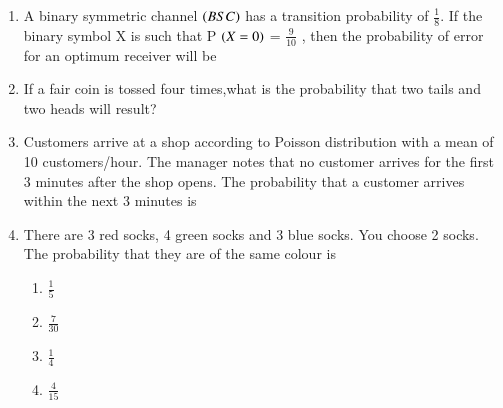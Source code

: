 \documentclass[journal,12pt,twocolumn]{IEEEtran}
\begin{document}
\begin{enumerate}
\begin{enumerate}[label=(\alph*)]
\end{enumerate}
%
%
\solution

%
\item A binary symmetric channel $\left(BSC\right)$ has a transition probability of $\frac{1}{8}$. If the binary symbol X is such that P $\left(X = 0\right)$ = $\frac{9}{10}$ , then the probability of error for an optimum receiver will be 
\begin{enumerate}[]
\end{enumerate}
%
\solution

%
\item If a fair coin is tossed four times,what is the probability that two tails and two heads will result?
%
\solution

%
\item Customers arrive at a shop according to Poisson distribution with a mean of 10 customers/hour. The manager notes that no customer arrives for the first 3 minutes after the shop opens. The probability that a customer arrives within the next 3 minutes is

%
\solution

%
\item  There are 3 red socks, 4 green socks and 3 blue socks. You choose 2 socks. The probability that they are of the same colour is 

\begin{enumerate}
    \item $\frac{1}{5}$
    \item $\frac{7}{30}$
    \item $\frac{1}{4}$ 
    \item $\frac{4}{15}$ 
\end{enumerate}
%
\solution


\end{enumerate}
\end{document}
